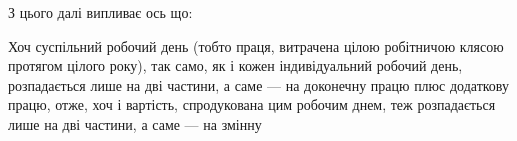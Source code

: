 З цього далі випливає ось що:

Хоч суспільний робочий день (тобто праця, витрачена цілою робітничою
клясою протягом цілого року), так само, як і кожен індивідуальний
робочий день, розпадається лише на дві частини, а саме — на доконечну
працю плюс додаткову працю, отже, хоч і вартість, спродукована цим
робочим днем, теж розпадається лише на дві частини, а саме — на змінну
\parbreak{}  %
